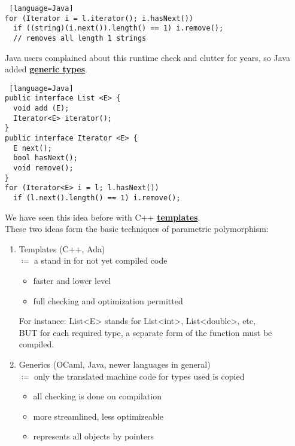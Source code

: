\documentclass[../../lecture_notes.tex]{subfiles}
\begin{document}
\begin{enumerate} [itemsep=0mm]
\begin{lstlisting} [language=Java]
for (Iterator i = l.iterator(); i.hasNext())
  if ((string)(i.next()).length() == 1) i.remove(); 
  // removes all length 1 strings
		\end{lstlisting}
		Java users complained about this runtime check and clutter for years, 
			so Java added \textbf{\underline{generic types}}.
		\begin{lstlisting} [language=Java]
public interface List <E> {
  void add (E);
  Iterator<E> iterator();
} 
public interface Iterator <E> {
  E next();
  bool hasNext();
  void remove();
}
for (Iterator<E> i = l; l.hasNext())
  if (l.next().length() == 1) i.remove();
		\end{lstlisting}
		We have seen this idea before with C++ \textbf{\underline{templates}}.\\
		These two ideas form the basic techniques of parametric polymorphism:
		\begin{enumerate} [itemsep=0mm]
			\item Templates (C++, Ada)\\
				$\coloneqq$ a stand in for not yet compiled code
				\begin{itemize} [itemsep=0mm]
					\item faster and lower level
					\item full checking and optimization permitted
				\end{itemize}
				For instance: List<E> stands for List<int>, List<double>, etc, \\
					BUT for each required type, a separate form of the function must be compiled.
			\item Generics (OCaml, Java, newer languages in general)\\
				$\coloneqq$ only the translated machine code for types used is copied
				\begin{itemize} [itemsep=0mm]
					\item all checking is done on compilation
					\item more streamlined, less optimizeable
					\item represents all objects by pointers
				\end{itemize}
		\end{enumerate}
\end{enumerate}
\end{document}
